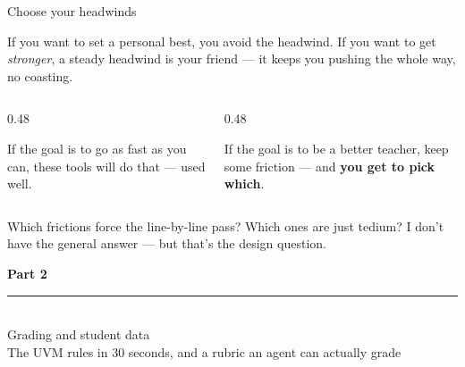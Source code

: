\documentclass[aspectratio=169, 10pt]{beamer}
\begin{document}
\begin{frame}{Choose your headwinds}
\vskip6pt
\begin{tcolorbox}[quotebox, top=5pt, bottom=5pt]
\small
If you want to set a personal best, you avoid the headwind. If you want to get \emph{stronger}, a steady headwind is your friend --- it keeps you pushing the whole way, no coasting.
\end{tcolorbox}
\vskip8pt
\begin{columns}[T]
\begin{column}{0.48\textwidth}
\begin{tcolorbox}[keybox, title={\faBolt\quad Fast}]
\small If the goal is to go as fast as you can, these tools will do that --- used well.
\end{tcolorbox}
\end{column}
\begin{column}{0.48\textwidth}
\begin{tcolorbox}[keybox, title={\faChalkboardTeacher\quad Better}]
\small If the goal is to be a better teacher, keep some friction --- and \textbf{you get to pick which}.
\end{tcolorbox}
\end{column}
\end{columns}
\vskip8pt
\begin{tcolorbox}[accentbox, halign=center, top=3pt, bottom=3pt]
\small Which frictions force the line-by-line pass? Which ones are just tedium? I don't have the general answer --- but that's the design question.
\end{tcolorbox}
\end{frame}


{
\begin{frame}
\centering\vfill
{\fontsize{22}{28}\bfseries\selectfont\color{white} Part 2}\\[6pt]
{\color{UVMGold}\rule{5cm}{0.8pt}}\\[6pt]
{\normalsize\color{UVMGold} Grading and student data}\\[4pt]
{\small\color{PaleSage} The UVM rules in 30 seconds, and a rubric an agent can actually grade}
\vfill
\end{frame}
}
\end{document}
